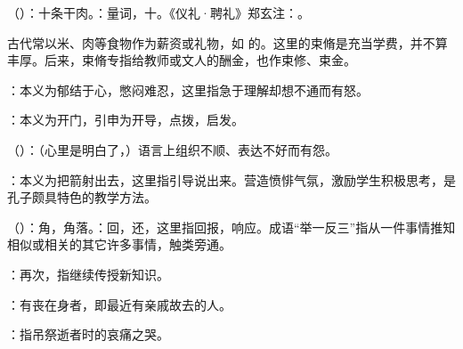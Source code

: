 {
\item {}（）：十条干肉。：量词，十。《仪礼·聘礼》郑玄注：。

古代常以米、肉等食物作为薪资或礼物，如  的。这里的束脩是充当学费，并不算丰厚。后来，束脩专指给教师或文人的酬金，也作束修、束金。
}
{}


{
\item {}：本义为郁结于心，憋闷难忍，这里指急于理解却想不通而有怒。

：本义为开门，引申为开导，点拨，启发。

\item {}（）：（心里是明白了，）语言上组织不顺、表达不好而有怨。

：本义为把箭射出去，这里指引导说出来。营造愤悱气氛，激励学生积极思考，是孔子颇具特色的教学方法。

\item {}（）：角，角落。：回，还，这里指回报，响应。成语“举一反三”指从一件事情推知相似或相关的其它许多事情，触类旁通。
\item {}：再次，指继续传授新知识。
}
{}


{
\item {}：有丧在身者，即最近有亲戚故去的人。%
}
{}


{
\item {}：指吊祭逝者时的哀痛之哭。
}
{}



